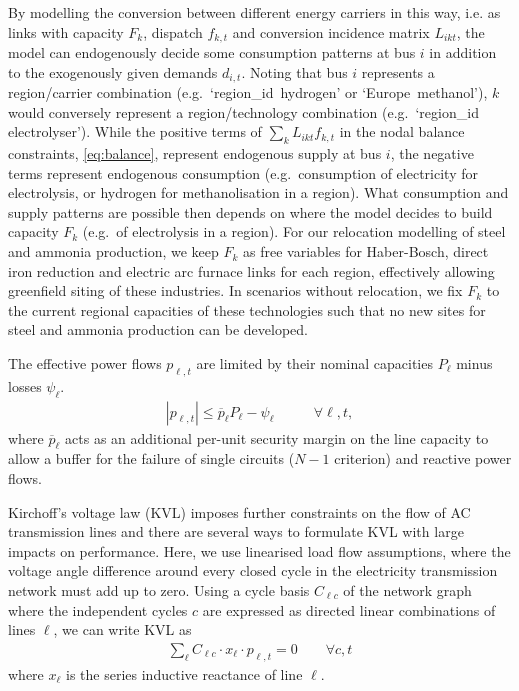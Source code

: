 By modelling the conversion between different energy carriers in this way, i.e.
as links with capacity $F_k$, dispatch $f_{k,t}$ and conversion incidence matrix
$L_{ikt}$, the model can endogenously decide some consumption patterns at bus
$i$ in addition to the exogenously given demands $d_{i,t}$. Noting that bus $i$
represents a region/carrier combination (e.g.~`region\_id~hydrogen' or
`Europe~methanol'), $k$ would conversely represent a region/technology combination
(e.g.~`region\_id electrolyser'). While the positive terms of $\sum_k L_{ikt}
f_{k,t}$ in the nodal balance constraints, \cref{eq:balance}, represent
endogenous supply at bus $i$, the negative terms represent endogenous
consumption (e.g.~consumption of electricity for electrolysis, or hydrogen for
methanolisation in a region). What consumption and supply patterns are possible
then depends on where the model decides to build capacity $F_k$ (e.g.~of
electrolysis in a region). For our relocation modelling of steel and ammonia
production, we keep $F_k$ as free variables for Haber-Bosch, direct iron
reduction and electric arc furnace links for each region, effectively allowing
greenfield siting of these industries. In scenarios without relocation, we fix
$F_k$ to the current regional capacities of these technologies such that no new
sites for steel and ammonia production can be developed.

The effective power flows $p_{\ell,t}$ are limited by their nominal capacities $P_\ell$ minus losses $\psi_\ell$.
\begin{align}
	|p_{\ell,t}| \leq \overline{p}_{\ell} P_{\ell} - \psi_\ell & \qquad\forall \ell, t,
	\label{eq:cap}
\end{align}
where $\overline{p}_\ell$ acts as an additional per-unit security margin on the line capacity
to allow a buffer for the failure of single circuits ($N-1$ criterion) and reactive power flows.

Kirchoff's voltage law (KVL) imposes further constraints on the flow of AC
transmission lines and there are several ways to formulate KVL with large
impacts on performance. Here, we use linearised load flow assumptions, where the
voltage angle difference around every closed cycle in the electricity
transmission network must add up to zero. Using a cycle basis $C_{\ell c}$ of
the network graph where the independent cycles $c$ are expressed as directed
linear combinations of lines $\ell$, we can write
KVL as
\begin{align}
    \sum_\ell C_{\ell c} \cdot x_\ell \cdot p_{\ell,t} = 0 \qquad\forall c,t
    \label{eq:kvl}
\end{align}
where $x_\ell$ is the series inductive reactance of line $\ell$.

